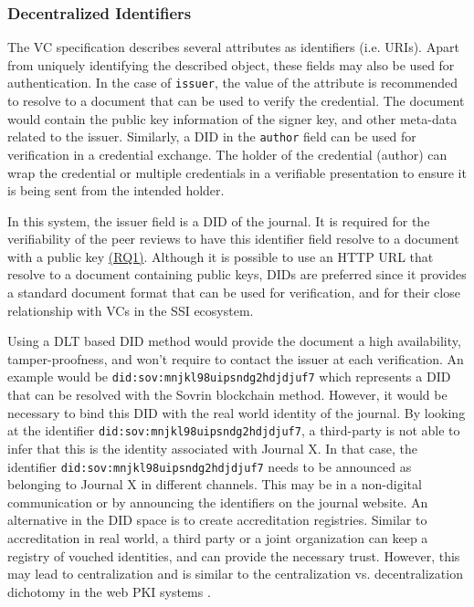 \subsubsection{Decentralized Identifiers}

The \acrshort{VC} specification describes several attributes as identifiers (i.e. \acrshort{URI}s). Apart from uniquely identifying the described object, these fields may also be used for authentication. In the case of \lstinline{issuer}, the value of the attribute is recommended to resolve to a document that can be used to verify the credential. The document would contain the public key information of the signer key, and other meta-data related to the issuer. Similarly, a \acrshort{DID} in the \lstinline{author} field can be used for verification in a credential exchange. The holder of the credential (author) can wrap the credential or multiple credentials in a verifiable presentation to ensure it is being sent from the intended holder. 

In this system, the issuer field is a \acrshort{DID} of the journal. It is required for the verifiability of the peer reviews to have this identifier field resolve to a document with a public key \hyperref[rq:verifiable]{(RQ1)}. Although it is possible to use an \acrshort{HTTP} \acrshort{URL} that resolve to a document containing public keys, \acrshort{DID}s are preferred since it provides a standard document format that can be used for verification, and for their close relationship with \acrshort{VC}s in the \acrshort{SSI} ecosystem. 

Using a \acrshort{DLT} based \acrshort{DID} method would provide the document a high availability, tamper-proofness, and won't require to contact the issuer at each verification. An example would be \lstinline{did:sov:mnjkl98uipsndg2hdjdjuf7} which represents a DID that can be resolved with the Sovrin blockchain method. However, it would be necessary to bind this \acrshort{DID} with the real world identity of the journal. By looking at the identifier \lstinline{did:sov:mnjkl98uipsndg2hdjdjuf7}, a third-party is not able to infer that this is the identity associated with Journal X. In that case, the identifier \lstinline{did:sov:mnjkl98uipsndg2hdjdjuf7} needs to be announced as belonging to Journal X in different channels. This may be in a non-digital communication or by announcing the identifiers on the journal website. An alternative in the \acrshort{DID} space is to create accreditation registries. Similar to accreditation in real world, a third party or a joint organization can keep a registry of vouched identities, and can provide the necessary trust. However, this may lead to centralization and is similar to the centralization vs. decentralization dichotomy in the web \acrshort{PKI} systems \parencite{Perlman1999}.


